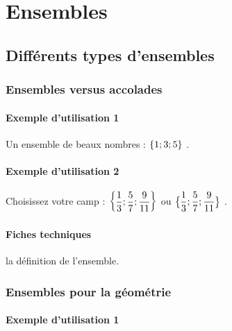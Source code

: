 \documentclass[12pt,a4paper]{article}
\begin{document}
\section{Ensembles}

\subsection{Différents types d'ensembles}

\subsubsection{Ensembles versus accolades}

\paragraph{Exemple d'utilisation 1}

\begin{tcblisting}{}
Un ensemble de beaux nombres : $\setgene{1 ; 3 ; 5}$ .
\end{tcblisting}


\paragraph{Exemple d'utilisation 2}

\begin{tcblisting}{}
Choisissez votre camp :
$\displaystyle \setgene{\frac{1}{3} ; \frac{5}{7} ; \frac{9}{11}}$
ou
$\displaystyle \setgene*{\frac{1}{3} ; \frac{5}{7} ; \frac{9}{11}}$ .
\end{tcblisting}


\paragraph{Fiches techniques}



\IDarg{} la définition de l'ensemble.



\subsubsection{Ensembles pour la géométrie}

\paragraph{Exemple d'utilisation 1}
\end{document}
